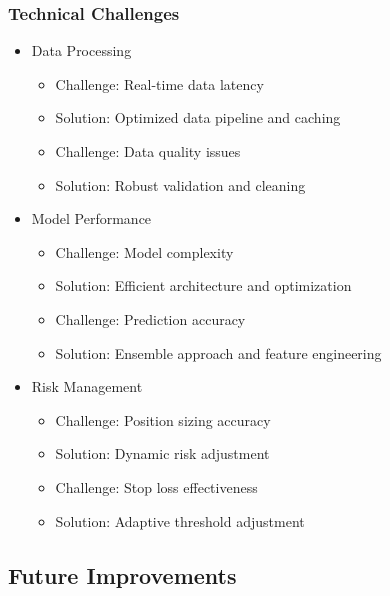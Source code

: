 \documentclass[conference]{IEEEtran}
\begin{document}
\subsubsection{Technical Challenges}
\begin{itemize}
    \item Data Processing
    \begin{itemize}
        \item Challenge: Real-time data latency
        \item Solution: Optimized data pipeline and caching
        \item Challenge: Data quality issues
        \item Solution: Robust validation and cleaning
    \end{itemize}
    
    \item Model Performance
    \begin{itemize}
        \item Challenge: Model complexity
        \item Solution: Efficient architecture and optimization
        \item Challenge: Prediction accuracy
        \item Solution: Ensemble approach and feature engineering
    \end{itemize}
    
    \item Risk Management
    \begin{itemize}
        \item Challenge: Position sizing accuracy
        \item Solution: Dynamic risk adjustment
        \item Challenge: Stop loss effectiveness
        \item Solution: Adaptive threshold adjustment
    \end{itemize}
\end{itemize}

\subsection{Future Improvements}
\end{document}
